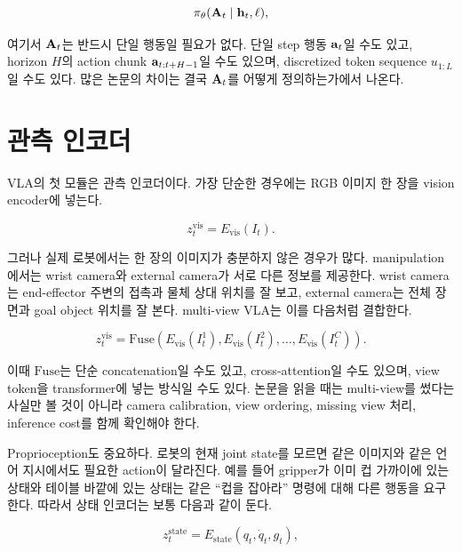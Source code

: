 \begin{equation}
  \pi_\theta(\mathbf{A}_t \mid \mathbf{h}_t, \ell),
  \label{eq:general_vla}
\end{equation}

여기서 $\mathbf{A}_t$는 반드시 단일 행동일 필요가 없다. 단일 step 행동 $\mathbf{a}_t$일 수도 있고, horizon $H$의 action chunk $\mathbf{a}_{t:t+H-1}$일 수도 있으며, discretized token sequence $u_{1:L}$일 수도 있다. 많은 논문의 차이는 결국 $\mathbf{A}_t$를 어떻게 정의하는가에서 나온다.

\section{관측 인코더}

VLA의 첫 모듈은 관측 인코더이다. 가장 단순한 경우에는 RGB 이미지 한 장을 vision encoder에 넣는다.

\begin{equation}
  z_t^{\mathrm{vis}} = E_{\mathrm{vis}}(I_t).
\end{equation}

그러나 실제 로봇에서는 한 장의 이미지가 충분하지 않은 경우가 많다. manipulation에서는 wrist camera와 external camera가 서로 다른 정보를 제공한다. wrist camera는 end-effector 주변의 접촉과 물체 상대 위치를 잘 보고, external camera는 전체 장면과 goal object 위치를 잘 본다. multi-view VLA는 이를 다음처럼 결합한다.

\begin{equation}
  z_t^{\mathrm{vis}}
  =
  \mathrm{Fuse}\left(
    E_{\mathrm{vis}}(I_t^1),
    E_{\mathrm{vis}}(I_t^2),
    \ldots,
    E_{\mathrm{vis}}(I_t^C)
  \right).
  \label{eq:multiview}
\end{equation}

이때 $\mathrm{Fuse}$는 단순 concatenation일 수도 있고, cross-attention일 수도 있으며, view token을 transformer에 넣는 방식일 수도 있다. 논문을 읽을 때는 multi-view를 썼다는 사실만 볼 것이 아니라 camera calibration, view ordering, missing view 처리, inference cost를 함께 확인해야 한다.

Proprioception도 중요하다. 로봇의 현재 joint state를 모르면 같은 이미지와 같은 언어 지시에서도 필요한 action이 달라진다. 예를 들어 gripper가 이미 컵 가까이에 있는 상태와 테이블 바깥에 있는 상태는 같은 ``컵을 잡아라'' 명령에 대해 다른 행동을 요구한다. 따라서 상태 인코더는 보통 다음과 같이 둔다.

\begin{equation}
  z_t^{\mathrm{state}} = E_{\mathrm{state}}(q_t, \dot{q}_t, g_t),
\end{equation}

